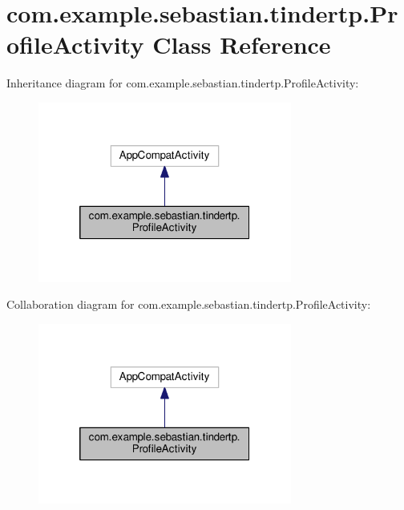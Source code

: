 \hypertarget{classcom_1_1example_1_1sebastian_1_1tindertp_1_1ProfileActivity}{}\section{com.\+example.\+sebastian.\+tindertp.\+Profile\+Activity Class Reference}
\label{classcom_1_1example_1_1sebastian_1_1tindertp_1_1ProfileActivity}


Inheritance diagram for com.\+example.\+sebastian.\+tindertp.\+Profile\+Activity\+:\nopagebreak
\begin{figure}[H]
\begin{center}
\leavevmode
\includegraphics[width=236pt]{classcom_1_1example_1_1sebastian_1_1tindertp_1_1ProfileActivity__inherit__graph}
\end{center}
\end{figure}


Collaboration diagram for com.\+example.\+sebastian.\+tindertp.\+Profile\+Activity\+:\nopagebreak
\begin{figure}[H]
\begin{center}
\leavevmode
\includegraphics[width=236pt]{classcom_1_1example_1_1sebastian_1_1tindertp_1_1ProfileActivity__coll__graph}
\end{center}
\end{figure}
